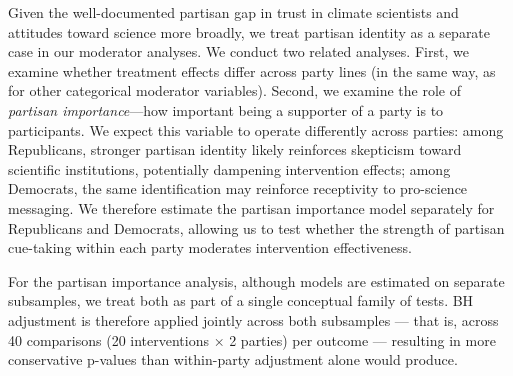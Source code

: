 \documentclass[
  letterpaper,
  DIV=11,
  numbers=noendperiod]{scrartcl}
\begin{document}
Given the well-documented partisan gap in trust in climate scientists
and attitudes toward science more broadly, we treat partisan identity as
a separate case in our moderator analyses. We conduct two related
analyses. First, we examine whether treatment effects differ across
party lines (in the same way, as for other categorical moderator
variables). Second, we examine the role of \emph{partisan
importance}---how important being a supporter of a party is to
participants. We expect this variable to operate differently across
parties: among Republicans, stronger partisan identity likely reinforces
skepticism toward scientific institutions, potentially dampening
intervention effects; among Democrats, the same identification may
reinforce receptivity to pro-science messaging. We therefore estimate
the partisan importance model separately for Republicans and Democrats,
allowing us to test whether the strength of partisan cue-taking within
each party moderates intervention effectiveness.

For the partisan importance analysis, although models are estimated on
separate subsamples, we treat both as part of a single conceptual family
of tests. BH adjustment is therefore applied jointly across both
subsamples --- that is, across 40 comparisons (20 interventions × 2
parties) per outcome --- resulting in more conservative p-values than
within-party adjustment alone would produce.
\end{document}
